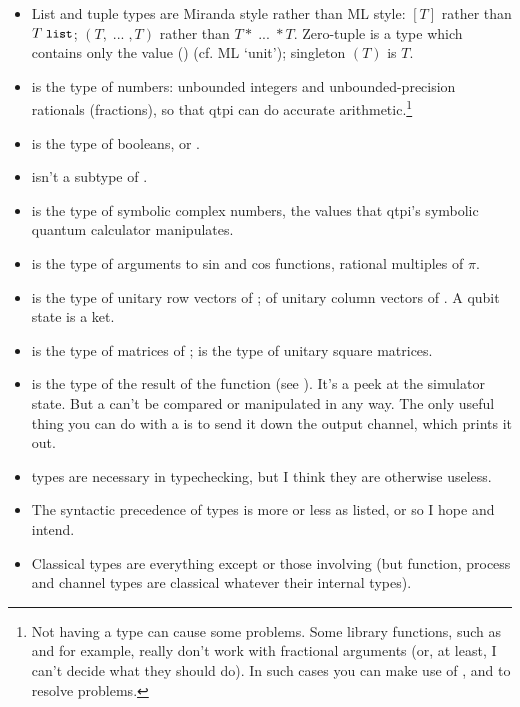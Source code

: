 \begin{itemize}
\item List and tuple types are Miranda style rather than ML style: $[T]$ rather than $T\;\texttt{\small{}list}$; $(T,\;...\;,T)$ rather than $T*\;...\;*T$. Zero-tuple is a type which contains only the value () (cf. ML `unit'); singleton $(T)$ is $T$.
\item {} is the type of numbers: unbounded integers and unbounded-precision rationals (fractions), so that qtpi can do accurate arithmetic.\footnote{Not having a type  can cause some problems. Some library functions, such as  and  for example, really don't work with fractional arguments (or, at least, I can't decide what they should do). In such cases you can make use of ,  and  to resolve problems.}
\item {} is the type of booleans,  or .
\item {} isn't a subtype of .
\item {} is the type of symbolic complex numbers, the values that qtpi's symbolic quantum calculator manipulates.
\item {} is the type of arguments to sin and cos functions, rational multiples of $\pi$.
\item {} is the type of unitary row vectors of ;  of unitary column vectors of . A qubit state is a ket.
\item {}  is the type of matrices of ;  is the type of unitary square matrices.
\item {}  is the type of the result of the   function (see ). It's a peek at the simulator state. But a  can't be compared or manipulated in any way. The only useful thing you can do with a   is to send it down the  output channel, which prints it out.
\item {} types are necessary in typechecking, but I think they are otherwise useless.
\item The syntactic precedence of types is more or less as listed, or so I hope and intend. 
\item Classical types are everything except   or those involving   (but function, process and channel types are classical whatever their internal types).  

\end{itemize}
